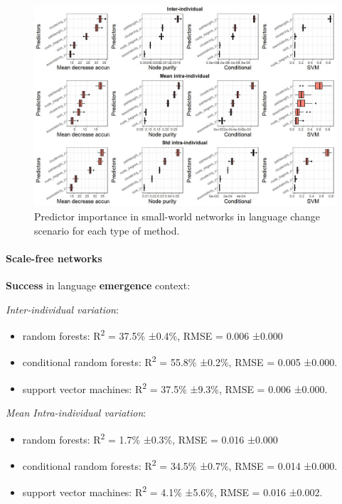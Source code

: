 \documentclass[
]{article}
\providecommand{\tightlist}{%
  \setlength{\itemsep}{0pt}\setlength{\parskip}{0pt}}
\begin{document}
\begin{figure}[!H]

{\centering \includegraphics{./Figures/unnamed-chunk-104-1} 

}

\caption{Predictor importance in small-world networks in language change scenario for each type of method.}\label{fig:unnamed-chunk-104}
\end{figure}

\hypertarget{scale-free-networks}{%
\paragraph{Scale-free networks}\label{scale-free-networks}}

\textbf{Success} in language \textbf{emergence} context:

\emph{Inter-individual variation}:

\begin{itemize}
\tightlist
\item
  random forests: R\textsuperscript{2} = 37.5\% ±0.4\%, RMSE = 0.006
  ±0.000
\item
  conditional random forests: R\textsuperscript{2} = 55.8\% ±0.2\%, RMSE
  = 0.005 ±0.000.
\item
  support vector machines: R\textsuperscript{2} = 37.5\% ±9.3\%, RMSE =
  0.006 ±0.000.
\end{itemize}

\emph{Mean Intra-individual variation}:

\begin{itemize}
\tightlist
\item
  random forests: R\textsuperscript{2} = 1.7\% ±0.3\%, RMSE = 0.016
  ±0.000
\item
  conditional random forests: R\textsuperscript{2} = 34.5\% ±0.7\%, RMSE
  = 0.014 ±0.000.
\item
  support vector machines: R\textsuperscript{2} = 4.1\% ±5.6\%, RMSE =
  0.016 ±0.002.
\end{itemize}
\end{document}
